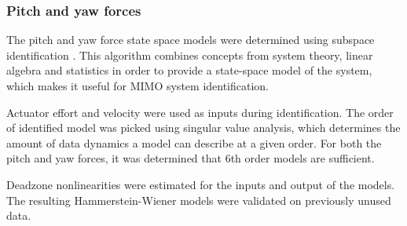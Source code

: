 \subsubsection{Pitch and yaw forces}
The pitch and yaw force state space models were determined using subspace identification  \cite{van2012subspace}. This algorithm combines concepts from system theory, linear algebra and statistics in order to provide a state-space model of the system, which makes it useful for MIMO system identification. 

Actuator effort and velocity were used as inputs during identification.
The order of identified model was picked using singular value analysis, which determines the amount of data dynamics a model can describe at a given order. For both the pitch and yaw forces, it was determined that 6th order models are sufficient. 

Deadzone nonlinearities were estimated for the inputs and output of the models. The resulting Hammerstein-Wiener models were validated on previously unused data.




